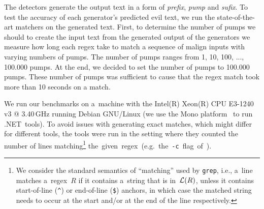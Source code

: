 \documentclass[acmsmall,screen]{acmart}
\begin{document}
%
The detectors generate the output text in a form of \emph{prefix}, \emph{pump} and \emph{sufix}.
%
To test the accuracy of each generator's predicted evil text, we run the state-of-the-art matchers on the generated text.
%
First, to determine the number of pumps we should to create the input text from the generated output of the generators
%
we measure how long each regex take to match a sequence of malign inputs with varying numbers of pumps. 
%
The number of pumps ranges from 1, 10, 100, ..., 100.000 pumps. 
%
At the end, we decided to set the number of pumps to 100.000 pumps.
%
These number of pumps was sufficient to cause that the regex match took more than 10 seconds on a match.


We run our benchmarks on a~machine with the Intel(R) Xeon(R) CPU E3-1240 v3 @
3.40\,GHz running Debian GNU/Linux (we use the Mono
platform~\cite{mono} to run .NET~tools).
To avoid issues with generating exact matches,
which might differ for different tools,
the tools were run in the setting where they counted the number of lines
matching\footnote{%
We consider the standard semantics of ``matching'' used by \texttt{grep}, i.e.,
a~line matches a~regex~$R$ if it contains a~string that is in~$\mathcal{L}(R)$, unless it
contains start-of-line (\texttt{\^}) or end-of-line (\texttt{\$}) anchors, in which
case the matched string needs to occur at the start and/or at the end of the
line respectively.
}
\mbox{the given regex (e.g.\ the \texttt{-c} flag of \grep).}


%

\vspace{-0.0mm}
\end{document}
